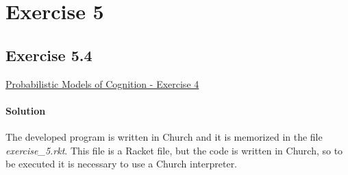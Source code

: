 \section*{Exercise 5}

\subsection*{Exercise 5.4}
\href{http://v1.probmods.org/conditioning.html#exercises}{Probabilistic Models of Cognition - Exercise 4}

\paragraph{Solution}
The developed program is written in Church and it is memorized in the file \textit{exercise\_5.rkt}. This file is a Racket file, but 
the code is written in Church, so to be executed it is necessary to use a Church interpreter.

